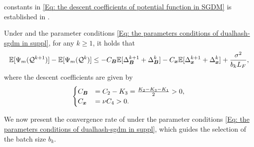 constants in \eqref{Eq: the descent coefficients of potential function in SGDM}
is established in .
\begin{lemma}
    \label{Lemma: approximate sufficient descent property in SGDM} Under  and the parameter conditions \eqref{Eq: the parameters conditions of dualhash-sgdm in suppl}, for any $k \geq 1$, it holds that
    \begin{align}
        \label{Eq: the descent property of Lyapunov func in SGDM}\mathbb{E} [\Psi_m(\mathcal{Q}^{k+1})] - \mathbb{E}[\Psi_m(\mathcal{Q}^{k})] \leq -C_{\bm{B}}\mathbb{E}[\Delta_{\bm{B}}^{k+1}+ \Delta_{\bm{B}}^{k}] -C_{\bm{x}}\mathbb{E} [\Delta_{\bm{x}}^{k+1}+ \Delta_{\bm{x}}^{k}] + \frac{\sigma^{2}}{b_{k}L_{F}},
    \end{align}
    where the descent coefficients are given by
    \begin{align}
        \label{Eq: the descent coefficients of potential function in SGDM}\begin{cases}C_{\bm{B}}&= C_{2}- K_{3}= \frac{K_2 - K_3 -K_1}{2}>0, \\ C_{\bm{x}}&= \nu C_{4}>0.\end{cases}
    \end{align}
\end{lemma}

We now present the convergence rate of  under the parameter conditions \eqref{Eq: the parameters conditions of dualhash-sgdm in suppl}, which guides the selection of the batch size $b_k$. 

